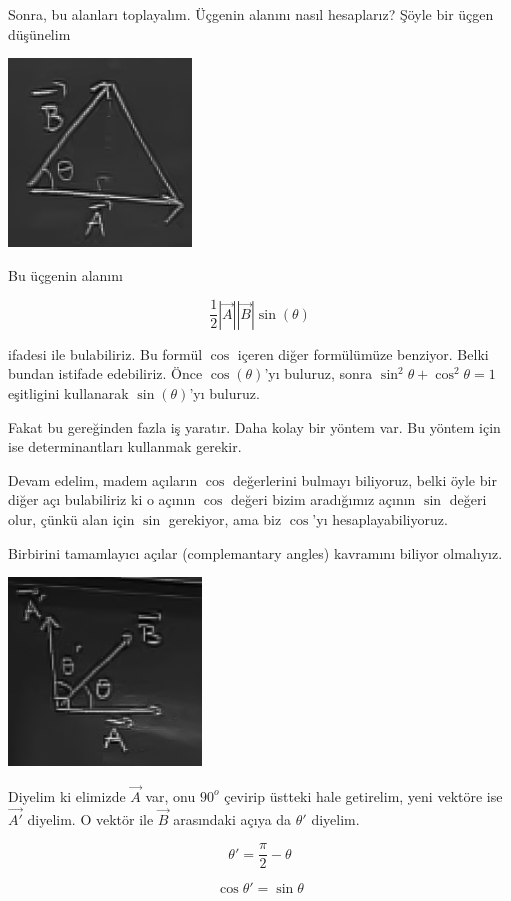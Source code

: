 \documentclass[12pt,fleqn]{article}\usepackage{../../common}
\begin{document}
Sonra, bu alanları toplayalım. Üçgenin alanını nasıl hesaplarız? Şöyle bir
üçgen düşünelim

\includegraphics[height=5cm]{2_5.png}

Bu üçgenin alanını

$$
\frac{1}{2}|\vec{A}||\vec{B}|\sin(\theta)
$$

ifadesi ile bulabiliriz. Bu formül $\cos$ içeren diğer formülümüze benziyor.
Belki bundan istifade edebiliriz. Önce $\cos(\theta)$'yı buluruz, sonra
$\sin^2\theta + \cos^2\theta = 1$ eşitligini kullanarak $\sin(\theta)$'yı
buluruz.

Fakat bu gereğinden fazla iş yaratır. Daha kolay bir yöntem var. Bu yöntem için
ise determinantları kullanmak gerekir.

Devam edelim, madem açıların $\cos$ değerlerini bulmayı biliyoruz, belki öyle
bir diğer açı bulabiliriz ki o açının $\cos$ değeri bizim aradığımız açının
$\sin$ değeri olur, çünkü alan için $\sin$ gerekiyor, ama biz $\cos$'yı
hesaplayabiliyoruz.

Birbirini tamamlayıcı açılar (complemantary angles) kavramını biliyor olmalıyız.

\includegraphics[height=5cm]{2_6.png}

Diyelim ki elimizde $\vec{A}$ var, onu $90^o$ çevirip üstteki hale getirelim,
yeni vektöre ise $\vec{A'}$ diyelim. O vektör ile $\vec{B}$ arasındaki açıya da
$\theta'$ diyelim.

$$ \theta' = \frac{\pi}{2} - \theta $$

$$ \cos \theta' = \sin \theta $$
\end{document}
